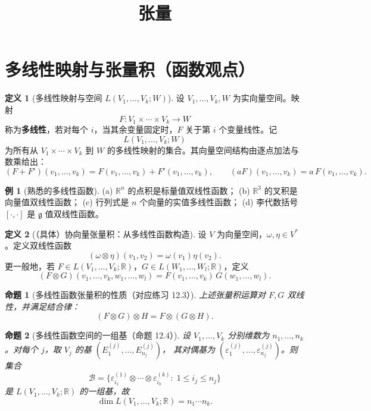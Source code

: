 \documentclass[11pt]{article}
\title{张量}
\author{}
\date{}
\theoremstyle{definition}
\newtheorem{definition}{定义}[section]
\newtheorem{example}{例}[section]
\theoremstyle{plain}
\newtheorem{proposition}{命题}[section]
\newcommand{\R}{\mathbb{R}}
\newcommand{\ot}{\otimes}
\begin{document}
\maketitle

\tableofcontents

\section{多线性映射与张量积（函数观点）}

\begin{definition}[多线性映射与空间 $L(V_1,\dots,V_k;W)$]
设 $V_1,\dots,V_k,W$ 为实向量空间。映射
\[
F:V_1\times\cdots\times V_k\to W
\]
称为\textbf{多线性}，若对每个 $i$，当其余变量固定时，$F$ 关于第 $i$ 个变量线性。记
\[
L(V_1,\dots,V_k;W)
\]
为所有从 $V_1\times\cdots\times V_k$ 到 $W$ 的多线性映射的集合。其向量空间结构由逐点加法与数乘给出：
\[
(F+F')(v_1,\dots,v_k)=F(v_1,\dots,v_k)+F'(v_1,\dots,v_k),\qquad
(aF)(v_1,\dots,v_k)=a\,F(v_1,\dots,v_k).
\]
\end{definition}

\begin{example}[熟悉的多线性函数]
(a) $\R^n$ 的点积是标量值双线性函数；\;
(b) $\R^3$ 的叉积是向量值双线性函数；\;
(c) 行列式是 $n$ 个向量的实值多线性函数；\;
(d) 李代数括号 $[\cdot,\cdot]$ 是 $\mathfrak{g}$ 值双线性函数。
\end{example}

\begin{definition}[（具体）协向量张量积：从多线性函数构造]
设 $V$ 为向量空间，$\omega,\eta\in V^*$。定义双线性函数
\[
(\omega\ot \eta)(v_1,v_2)=\omega(v_1)\eta(v_2).
\]
更一般地，若 $F\in L(V_1,\dots,V_k;\R)$，$G\in L(W_1,\dots,W_l;\R)$，定义
\[
(F\ot G)(v_1,\dots,v_k,w_1,\dots,w_l)=F(v_1,\dots,v_k)\,G(w_1,\dots,w_l).
\]
\end{definition}

\begin{proposition}[多线性函数张量积的性质（对应练习 12.3）]
上述张量积运算对 $F,G$ 双线性，并满足结合律：
\[
(F\ot G)\ot H = F\ot (G\ot H).
\]
\end{proposition}

\begin{proposition}[多线性函数空间的一组基（命题 12.4）]
设 $V_1,\dots,V_k$ 分别维数为 $n_1,\dots,n_k$。对每个 $j$，取 $V_j$ 的基 $(E^{(j)}_1,\dots,E^{(j)}_{n_j})$，
其对偶基为 $(\varepsilon^{(j)}_1,\dots,\varepsilon^{(j)}_{n_j})$。则集合
\[
\mathcal{B}=
\bigl\{\varepsilon^{(1)}_{i_1}\ot\cdots\ot \varepsilon^{(k)}_{i_k}:\;1\le i_j\le n_j\bigr\}
\]
是 $L(V_1,\dots,V_k;\R)$ 的一组基，故
\[
\dim L(V_1,\dots,V_k;\R)=n_1\cdots n_k.
\]
\end{proposition}
\end{document}
